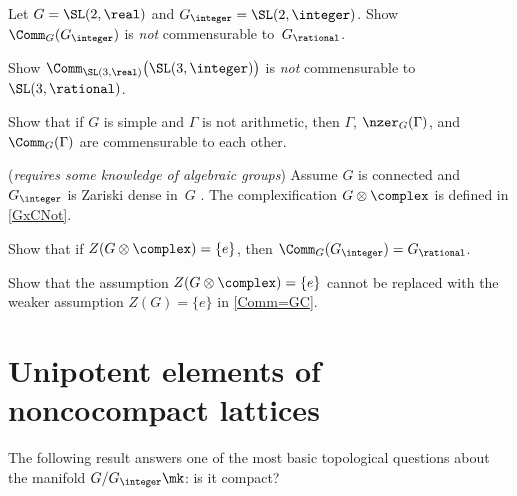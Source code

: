 \begin{exercises}
\noprelistbreak
\item \label{Comm(SL2Z)}
Let $G = \SL(2,\real)$ and $G_\integer = \SL(2,\integer)$.
Show  $\Comm_G(G_{\integer})$ is \emph{not}
commensurable to~$G_{\rational}$.

\item \label{Comm(SL3Z)}
Show $\Comm_{\SL(3,\real)} \bigl( \SL(3,\integer) \bigr)$
is \emph{not} commensurable to $\SL(3,\rational)$. 

\item \label{Comm(Gamma)discrete}
 Show that if $G$ is simple and $\Gamma$ is not arithmetic,
then $\Gamma$, $\nzer_G(\Gamma)$, and $\Comm_G(\Gamma)$ are
commensurable to each other.

\item \label{Comm=GC}
(\emph{requires some knowledge of algebraic groups})
Assume $G$ is connected and $G_{\integer}$ is Zariski dense in~$G$ . 
The complexification $G \otimes \complex$ is defined in \cref{GxCNot}.

Show that if $Z(G \otimes \complex) = \{e\}$, then $\Comm_G(G_{\integer}) = G_{\rational}$.

\item
Show that the assumption $Z(G \otimes \complex) = \{e\}$ cannot be replaced with the weaker assumption $Z(G) = \{e\}$ in \cref{Comm=GC}.

\end{exercises}





\section{Unipotent elements of noncocompact lattices} \label{GodementSect}

The following result answers one of the most basic topological questions about the manifold $G/G_\integer\mk$: is it compact?

